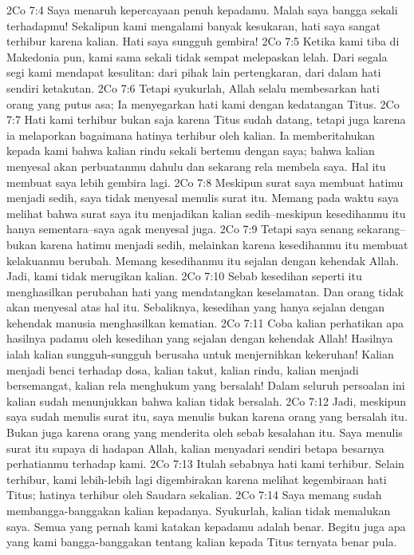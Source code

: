 2Co 7:4  Saya menaruh kepercayaan penuh kepadamu. Malah saya bangga sekali terhadapmu! Sekalipun kami mengalami banyak kesukaran, hati saya sangat terhibur karena kalian. Hati saya sungguh gembira!
2Co 7:5  Ketika kami tiba di Makedonia pun, kami sama sekali tidak sempat melepaskan lelah. Dari segala segi kami mendapat kesulitan: dari pihak lain pertengkaran, dari dalam hati sendiri ketakutan.
2Co 7:6  Tetapi syukurlah, Allah selalu membesarkan hati orang yang putus asa; Ia menyegarkan hati kami dengan kedatangan Titus.
2Co 7:7  Hati kami terhibur bukan saja karena Titus sudah datang, tetapi juga karena ia melaporkan bagaimana hatinya terhibur oleh kalian. Ia memberitahukan kepada kami bahwa kalian rindu sekali bertemu dengan saya; bahwa kalian menyesal akan perbuatanmu dahulu dan sekarang rela membela saya. Hal itu membuat saya lebih gembira lagi.
2Co 7:8  Meskipun surat saya membuat hatimu menjadi sedih, saya tidak menyesal menulis surat itu. Memang pada waktu saya melihat bahwa surat saya itu menjadikan kalian sedih--meskipun kesedihanmu itu hanya sementara--saya agak menyesal juga.
2Co 7:9  Tetapi saya senang sekarang--bukan karena hatimu menjadi sedih, melainkan karena kesedihanmu itu membuat kelakuanmu berubah. Memang kesedihanmu itu sejalan dengan kehendak Allah. Jadi, kami tidak merugikan kalian.
2Co 7:10  Sebab kesedihan seperti itu menghasilkan perubahan hati yang mendatangkan keselamatan. Dan orang tidak akan menyesal atas hal itu. Sebaliknya, kesedihan yang hanya sejalan dengan kehendak manusia menghasilkan kematian.
2Co 7:11  Coba kalian perhatikan apa hasilnya padamu oleh kesedihan yang sejalan dengan kehendak Allah! Hasilnya ialah kalian sungguh-sungguh berusaha untuk menjernihkan kekeruhan! Kalian menjadi benci terhadap dosa, kalian takut, kalian rindu, kalian menjadi bersemangat, kalian rela menghukum yang bersalah! Dalam seluruh persoalan ini kalian sudah menunjukkan bahwa kalian tidak bersalah.
2Co 7:12  Jadi, meskipun saya sudah menulis surat itu, saya menulis bukan karena orang yang bersalah itu. Bukan juga karena orang yang menderita oleh sebab kesalahan itu. Saya menulis surat itu supaya di hadapan Allah, kalian menyadari sendiri betapa besarnya perhatianmu terhadap kami.
2Co 7:13  Itulah sebabnya hati kami terhibur. Selain terhibur, kami lebih-lebih lagi digembirakan karena melihat kegembiraan hati Titus; hatinya terhibur oleh Saudara sekalian.
2Co 7:14  Saya memang sudah membangga-banggakan kalian kepadanya. Syukurlah, kalian tidak memalukan saya. Semua yang pernah kami katakan kepadamu adalah benar. Begitu juga apa yang kami bangga-banggakan tentang kalian kepada Titus ternyata benar pula.
